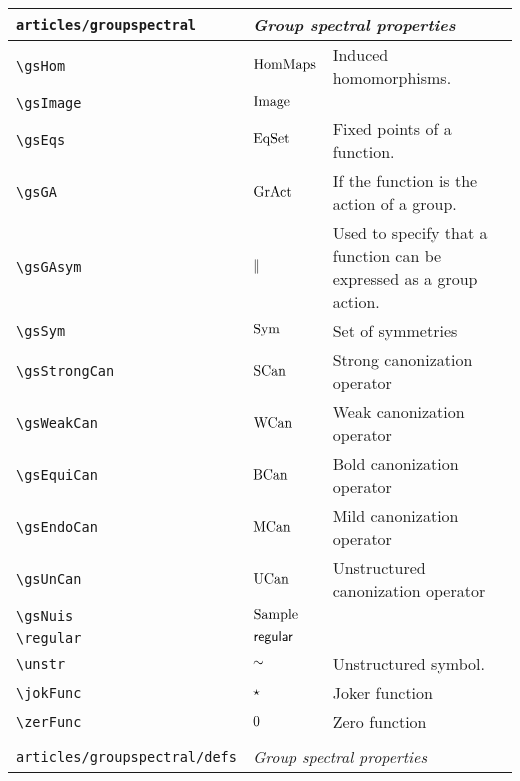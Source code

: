 \begin{longtable}{lll}
 {\color[rgb]{0.5,0.5,0.5}\texttt{articles/groupspectral}} & \multicolumn{2}{l}{\emph{Group spectral properties}}\\ 
 \hline
{\color[rgb]{0.5,0.5,0.5}\texttt{\textbackslash gsHom}} & $\text{HomMaps}$ &  Induced homomorphisms.\\ 
 {\color[rgb]{0.5,0.5,0.5}\texttt{\textbackslash gsImage}} & $\text{Image}$ &  \\ 
 {\color[rgb]{0.5,0.5,0.5}\texttt{\textbackslash gsEqs}} & $\text{EqSet}$ &  Fixed points of a function.\\ 
 {\color[rgb]{0.5,0.5,0.5}\texttt{\textbackslash gsGA}} & $\text{GrAct}$ &  If the function is the action of a group.\\ 
 {\color[rgb]{0.5,0.5,0.5}\texttt{\textbackslash gsGAsym}} & $\parallel$ &  Used to specify that a function can be expressed as a group action.\\ 
 {\color[rgb]{0.5,0.5,0.5}\texttt{\textbackslash gsSym}} & $\text{Sym}$ &  Set of symmetries\\ 
 {\color[rgb]{0.5,0.5,0.5}\texttt{\textbackslash gsStrongCan}} & $\text{SCan}$ &  Strong canonization operator\\ 
 {\color[rgb]{0.5,0.5,0.5}\texttt{\textbackslash gsWeakCan}} & $\text{WCan}$ &  Weak canonization operator\\ 
 {\color[rgb]{0.5,0.5,0.5}\texttt{\textbackslash gsEquiCan}} & $\text{BCan}$ &  Bold canonization operator\\ 
 {\color[rgb]{0.5,0.5,0.5}\texttt{\textbackslash gsEndoCan}} & $\text{MCan}$ &  Mild canonization operator\\ 
 {\color[rgb]{0.5,0.5,0.5}\texttt{\textbackslash gsUnCan}} & $\text{UCan}$ &  Unstructured canonization operator\\ 
 {\color[rgb]{0.5,0.5,0.5}\texttt{\textbackslash gsNuis}} & $\text{Sample}$ &  \\ 
 {\color[rgb]{0.5,0.5,0.5}\texttt{\textbackslash regular}} & $\mathsf{regular}$ & \\ 
 {\color[rgb]{0.5,0.5,0.5}\texttt{\textbackslash unstr}} & $\sim$ &  Unstructured symbol.\\ 
 {\color[rgb]{0.5,0.5,0.5}\texttt{\textbackslash jokFunc}} & $\star$ &  Joker function\\ 
 {\color[rgb]{0.5,0.5,0.5}\texttt{\textbackslash zerFunc}} & $0$ &  Zero function\\ 
  &  & \\ 
 {\color[rgb]{0.5,0.5,0.5}\texttt{articles/groupspectral/defs}} & \multicolumn{2}{l}{\emph{Group spectral properties}}\\ 

\end{longtable}
